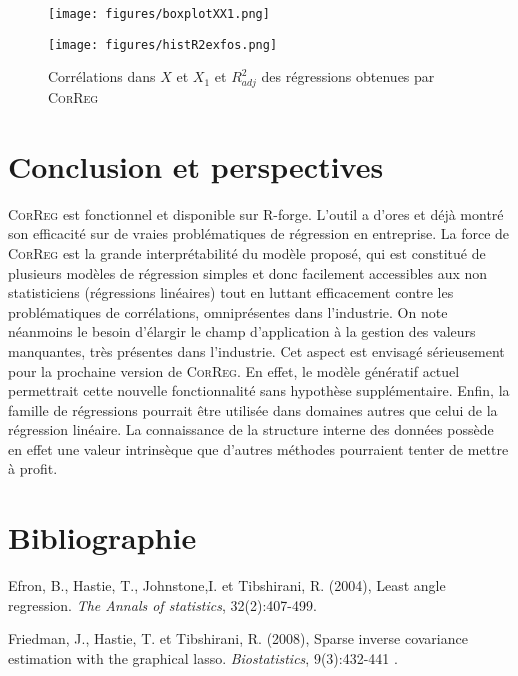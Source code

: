 \documentclass[12pt]{article}
\begin{document}
\begin{figure}[h!]
	\begin{minipage}[c]{.5\linewidth}
			\texttt{[image: figures/boxplotXX1.png]} 
	\end{minipage} \hfill
   \begin{minipage}[c]{.35\linewidth}
			\texttt{[image: figures/histR2exfos.png]} 
   \end{minipage}
  \caption{Corrélations dans $X$ et $X_1$ et $R^2_{adj}$ des régressions obtenues par \textsc{CorReg} }
\end{figure}   
	

\section{Conclusion et perspectives}\label{secconcl}
	\textsc{CorReg} est fonctionnel et disponible sur R-forge. L'outil a d'ores et déjà montré son efficacité sur de vraies problématiques de régression en entreprise.
	La force de \textsc{CorReg} est la grande interprétabilité du modèle proposé, qui est constitué de plusieurs modèles de régression simples et donc facilement accessibles aux non statisticiens (régressions linéaires) tout en luttant efficacement contre les problématiques de corrélations, omniprésentes dans l'industrie.
	On note néanmoins le besoin d'élargir le champ d'application à la gestion des valeurs manquantes, très présentes dans l'industrie. Cet aspect est envisagé sérieusement pour la prochaine version de \textsc{CorReg}. En effet, le modèle génératif actuel permettrait cette nouvelle fonctionnalité sans hypothèse supplémentaire. Enfin, la famille de régressions pourrait être utilisée dans domaines autres que celui de la régression linéaire. La connaissance de la structure interne des données possède en effet une valeur intrinsèque que d'autres méthodes pourraient tenter de mettre à profit.
	

\section*{Bibliographie}
%

\noindent [1] Efron, B., Hastie, T., Johnstone,I. et Tibshirani, R. (2004), Least angle regression. {\it The
Annals of statistics}, 32(2):407-499.

\noindent [2] Friedman, J., Hastie, T. et Tibshirani, R. (2008), Sparse inverse covariance estimation with
the graphical lasso.  {\it Biostatistics}, 9(3):432-441 .
\end{document}
